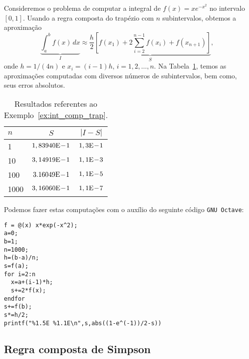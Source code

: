 \begin{ex}\label{ex:int_comp_trap}
  Consideremos o problema de computar a integral de $f(x)=xe^{-x^2}$ no intervalo $[0, 1]$. Usando a regra composta do trapézio com $n$ subintervalos, obtemos a aproximação
  \begin{equation}
    \underbrace{\int_a^b f(x)\,dx}_{I} \approx \underbrace{\frac{h}{2}\left[f(x_1) + 2\sum_{i=2}^{n-1} f(x_i) + f(x_{n+1})\right]}_{S},
  \end{equation}
onde $h=1/(4n)$ e $x_i = (i-1)h$, $i=1, 2, \dotsc, n$. Na Tabela~\ref{tab:ex_int_comp_trap}, temos as aproximações computadas com diversos números de subintervalos, bem como, seus erros absolutos.

\begin{table}[h!]
  \centering
  \caption{Resultados referentes ao Exemplo~\ref{ex:int_comp_trap}.}
  \begin{tabular}{l|cc}
    $n$ & $S$ & $|I-S|$ \\\hline
    1   & $1,83940\mathrm{E}\!-\!1$ & $1,3\mathrm{E}\!-\!1$ \\
    10  & $3,14919\mathrm{E}\!-\!1$ & $1,1\mathrm{E}\!-\!3$ \\
    100 & $3.16049\mathrm{E}\!-\!1$ & $1,1\mathrm{E}\!-\!5$ \\
    1000& $3,16060\mathrm{E}\!-\!1$ & $1,1\mathrm{E}\!-\!7$ \\\hline
  \end{tabular}
  \label{tab:ex_int_comp_trap}
\end{table}

\ifisoctave
Podemos fazer estas computações com o auxílio do seguinte código \verb+GNU Octave+:
\begin{verbatim}
f = @(x) x*exp(-x^2);
a=0;
b=1;
n=1000;
h=(b-a)/n;
s=f(a);
for i=2:n
  x=a+(i-1)*h;
  s+=2*f(x);
endfor
s+=f(b);
s*=h/2;
printf("%1.5E %1.1E\n",s,abs((1-e^(-1))/2-s))
\end{verbatim}
\fi
\end{ex}

\subsection{Regra composta de Simpson}

